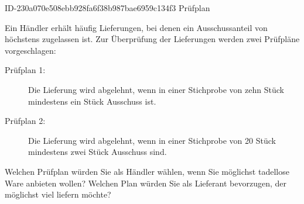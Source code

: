 \begin{exercise}
      {ID-230a070e508ebb928fa6f38b987bae6959c134f3}
      {Prüfplan}
  \ifproblem\problem\par
    Ein Händler erhält häufig Lieferungen, bei denen ein Ausschussanteil von
    höchstens  zugelassen ist. Zur Überprüfung der Lieferungen werden
    zwei Prüfpläne vorgeschlagen:
    \begin{description}
      \item[Prüfplan 1:]
           Die Lieferung wird abgelehnt, wenn in einer Stichprobe von zehn
           Stück mindestens ein Stück Ausschuss ist.
      \item[Prüfplan 2:]
           Die Lieferung wird abgelehnt, wenn in einer Stichprobe von 20
           Stück mindestens zwei Stück Ausschuss sind.
    \end{description}
    Welchen Prüfplan würden Sie als Händler wählen, wenn Sie möglichst
    tadellose Ware anbieten wollen? Welchen Plan würden Sie als Lieferant
    bevorzugen, der möglichst viel liefern möchte?
  \fi
\end{exercise}

